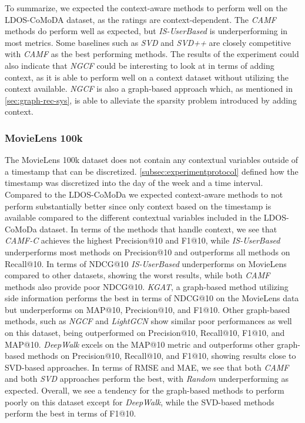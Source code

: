 To summarize, we expected the context-aware methods to perform well on the LDOS-CoMoDA dataset, as the ratings are context-dependent. 
The \textit{CAMF} methods do perform well as expected, but \textit{IS-UserBased} is underperforming in most metrics.
Some baselines such as \textit{SVD} and \textit{SVD++} are closely competitive with \textit{CAMF} as the best performing methods.
The results of the experiment could also indicate that \textit{NGCF} could be interesting to look at in terms of adding context, as it is able to perform well on a context dataset without utilizing the context available. 
\textit{NGCF} is also a graph-based approach which, as mentioned in \autoref{sec:graph-rec-sys}, is able to alleviate the sparsity problem introduced by adding context.

\subsubsection{MovieLens 100k}
The MovieLens 100k dataset does not contain any contextual variables outside of a timestamp that can be discretized.
\autoref{subsec:experimentprotocol} defined how the timestamp was discretized into the day of the week and a time interval.
Compared to the LDOS-CoMoDa we expected context-aware methods to not perform substantially better since only context based on the timestamp is available compared to the different contextual variables included in the LDOS-CoMoDa dataset. 
In terms of the methods that handle context, we see that \textit{CAMF-C} achieves the highest Precision@10 and F1@10, while \textit{IS-UserBased} underperforms most methods on Precision@10 and outperforms all methods on Recall@10.
In terms of NDCG@10 \textit{IS-UserBased} underperforms on MovieLens compared to other datasets, showing the worst results, while both \textit{CAMF} methods also provide poor NDCG@10.
\textit{KGAT}, a graph-based method utilizing side information performs the best in terms of NDCG@10 on the MovieLens data but underperforms on MAP@10, Precision@10, and F1@10.
Other graph-based methods, such as \textit{NGCF} and \textit{LightGCN} show similar poor performances as well on this dataset, being outperformed on Precision@10, Recall@10, F1@10, and MAP@10.
\textit{DeepWalk} excels on the MAP@10 metric and outperforms other graph-based methods on Precision@10, Recall@10, and F1@10, showing results close to SVD-based approaches.
In terms of RMSE and MAE, we see that both \textit{CAMF} and both \textit{SVD} approaches perform the best, with \textit{Random} underperforming as expected.
Overall, we see a tendency for the graph-based methods to perform poorly on this dataset except for \textit{DeepWalk}, while the SVD-based methods perform the best in terms of F1@10.

